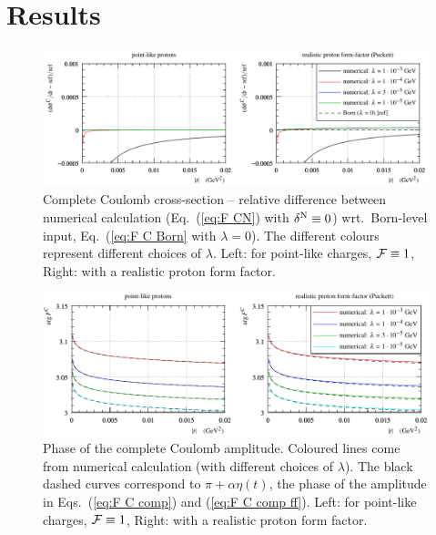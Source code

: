 \documentclass[pdftex,twocolumn,epjc3]{svjour3}
\begin{document}

\section{Results}
\label{sec:results}

\begin{figure}[h]
\begin{center}
\includegraphics{fig/coul_complete_cmp_lambda_dsdt.pdf}
\caption{Complete Coulomb cross-section -- relative difference between numerical calculation (Eq.~(\ref{eq:F CN}) with $\delta^{\rm N} \equiv 0$) wrt.~Born-level input, Eq.~(\ref{eq:F C Born} with $\lambda = 0$). The different colours represent different choices of $\lambda$. Left: for point-like charges, ${\cal F} \equiv 1$, Right: with a realistic proton form factor.}
\label{f:sig C}
\end{center}
\end{figure}

\begin{figure}[h]
\begin{center}
\includegraphics{fig/coul_complete_cmp_lambda_phase.pdf}
\caption{Phase of the complete Coulomb amplitude. Coloured lines come from numerical calculation (with different choices of $\lambda$). The black dashed curves correspond to $\pi + \alpha\eta(t)$, the phase of the amplitude in Eqs.~(\ref{eq:F C comp}) and (\ref{eq:F C comp ff}). Left: for point-like charges, ${\cal F} \equiv 1$, Right: with a realistic proton form factor.}
\label{f:arg F C}
\end{center}
\end{figure}
\end{document}
